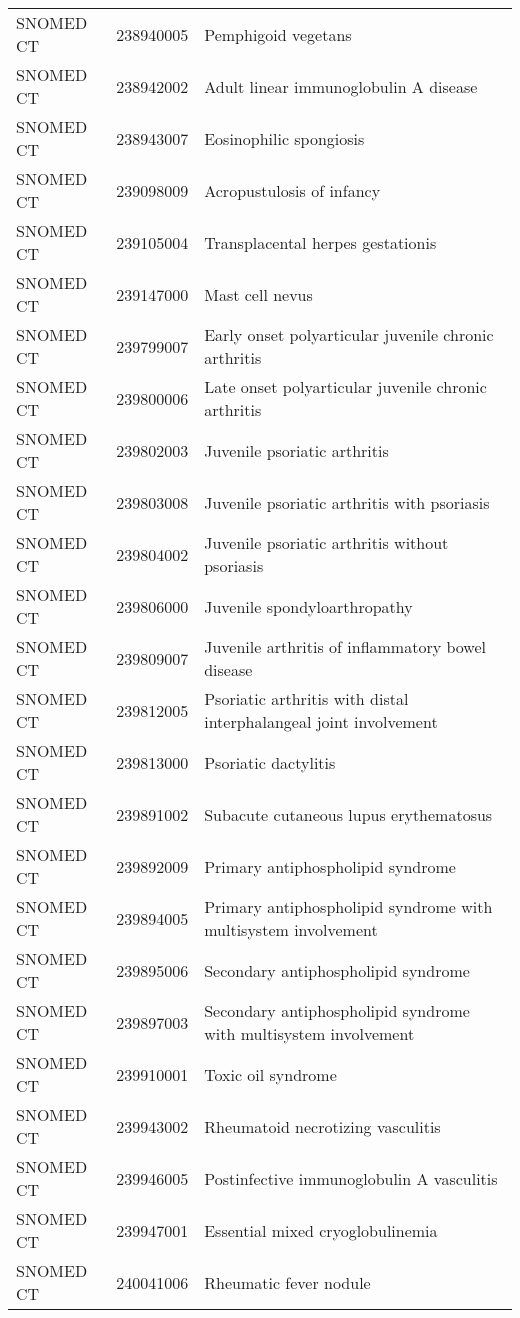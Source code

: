 \begin{longtable}{p{}p{}p{}}
  SNOMED CT & 238940005 & Pemphigoid vegetans \\ 
  SNOMED CT & 238942002 & Adult linear immunoglobulin A disease \\ 
  SNOMED CT & 238943007 & Eosinophilic spongiosis \\ 
  SNOMED CT & 239098009 & Acropustulosis of infancy \\ 
  SNOMED CT & 239105004 & Transplacental herpes gestationis \\ 
  SNOMED CT & 239147000 & Mast cell nevus \\ 
  SNOMED CT & 239799007 & Early onset polyarticular juvenile chronic arthritis \\ 
  SNOMED CT & 239800006 & Late onset polyarticular juvenile chronic arthritis \\ 
  SNOMED CT & 239802003 & Juvenile psoriatic arthritis \\ 
  SNOMED CT & 239803008 & Juvenile psoriatic arthritis with psoriasis \\ 
  SNOMED CT & 239804002 & Juvenile psoriatic arthritis without psoriasis \\ 
  SNOMED CT & 239806000 & Juvenile spondyloarthropathy \\ 
  SNOMED CT & 239809007 & Juvenile arthritis of inflammatory bowel disease \\ 
  SNOMED CT & 239812005 & Psoriatic arthritis with distal interphalangeal joint involvement \\ 
  SNOMED CT & 239813000 & Psoriatic dactylitis \\ 
  SNOMED CT & 239891002 & Subacute cutaneous lupus erythematosus \\ 
  SNOMED CT & 239892009 & Primary antiphospholipid syndrome \\ 
  SNOMED CT & 239894005 & Primary antiphospholipid syndrome with multisystem involvement \\ 
  SNOMED CT & 239895006 & Secondary antiphospholipid syndrome \\ 
  SNOMED CT & 239897003 & Secondary antiphospholipid syndrome with multisystem involvement \\ 
  SNOMED CT & 239910001 & Toxic oil syndrome \\ 
  SNOMED CT & 239943002 & Rheumatoid necrotizing vasculitis \\ 
  SNOMED CT & 239946005 & Postinfective immunoglobulin A vasculitis \\ 
  SNOMED CT & 239947001 & Essential mixed cryoglobulinemia \\ 
  SNOMED CT & 240041006 & Rheumatic fever nodule \\ 

\end{longtable}

